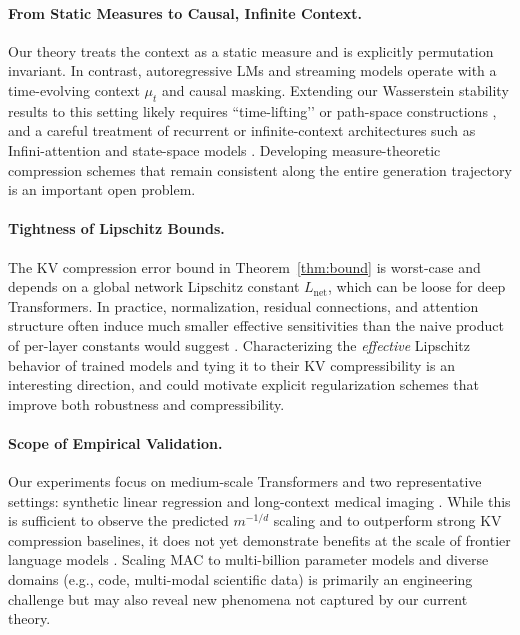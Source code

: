 \documentclass{article}
\theoremstyle{plain}
\theoremstyle{definition}
\theoremstyle{remark}
\begin{document}
\paragraph{From Static Measures to Causal, Infinite Context.}
Our theory treats the context as a static measure and is explicitly permutation
invariant. In contrast, autoregressive LMs and streaming models operate with a
time-evolving context $\mu_t$ and causal masking. Extending our Wasserstein stability
results to this setting likely requires “time-lifting’’ or path-space constructions
\citep{furuya2025transformers,castin2024how}, and a careful treatment of recurrent or
infinite-context architectures such as Infini-attention
\citep{munkhdalai2024leave,bertsch2024unlimiformer} and state-space models
\citep{gu2024mamba}. Developing measure-theoretic compression schemes that remain
consistent along the entire generation trajectory is an important open problem.

\paragraph{Tightness of Lipschitz Bounds.}
The KV compression error bound in Theorem~\ref{thm:bound} is worst-case and depends on a
global network Lipschitz constant $L_{\text{net}}$, which can be loose for deep
Transformers. In practice, normalization, residual connections, and attention structure
often induce much smaller effective sensitivities than the naive product of per-layer
constants would suggest \citep{castin2024how,sander2022sinkformers,chizat2018global}.
Characterizing the \emph{effective} Lipschitz behavior of trained models and tying it to
their KV compressibility is an interesting direction, and could motivate explicit
regularization schemes that improve both robustness and compressibility.

\paragraph{Scope of Empirical Validation.}
Our experiments focus on medium-scale Transformers and two representative settings:
synthetic linear regression and long-context medical imaging
\citep{moor2023foundation,setio2017validation}. While this is sufficient to observe the
predicted $m^{-1/d}$ scaling and to outperform strong KV compression baselines, it does
not yet demonstrate benefits at the scale of frontier language models
\citep{touvron2023llama,team2024gemini,ding2024longrope}. Scaling MAC to multi-billion
parameter models and diverse domains (e.g., code, multi-modal scientific data) is
primarily an engineering challenge but may also reveal new phenomena not captured by our
current theory.
\end{document}
